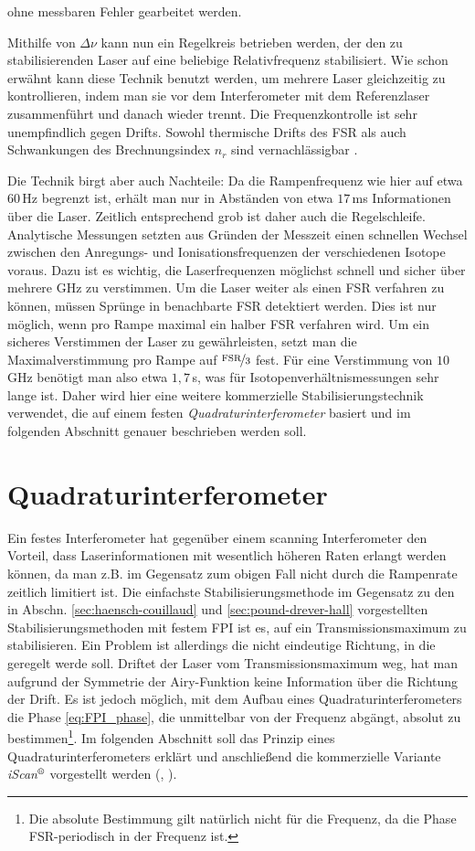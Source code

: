 ohne messbaren Fehler gearbeitet werden.\par
Mithilfe von $\Delta\nu$ kann nun ein Regelkreis betrieben werden, der den zu
stabilisierenden Laser auf eine beliebige Relativfrequenz stabilisiert. Wie
schon erwähnt kann diese Technik benutzt werden, um mehrere Laser
gleichzeitig zu kontrollieren, indem man sie vor dem Interferometer mit dem
Referenzlaser zusammenführt und danach wieder trennt. Die Frequenzkontrolle
ist sehr unempfindlich gegen Drifts. Sowohl thermische Drifts des FSR als auch
Schwankungen des Brechnungsindex $n_r$ sind vernachlässigbar
\cite{kuschnick:2000:diplomarbeit}.\par
Die Technik birgt aber auch Nachteile: Da die Rampenfrequenz wie hier auf etwa
$60\,$Hz begrenzt ist, erhält man nur in Abständen von etwa $17\,$ms
Informationen über die Laser. Zeitlich entsprechend grob ist daher auch die
Regelschleife. Analytische Messungen setzten aus Gründen der Messzeit einen
schnellen Wechsel zwischen den Anregungs- und Ionisationsfrequenzen der verschiedenen
Isotope voraus. Dazu ist es wichtig, die Laserfrequenzen möglichst schnell
und sicher über mehrere GHz zu verstimmen. Um die Laser weiter als einen FSR
verfahren zu können, müssen Sprünge in benachbarte FSR detektiert werden. Dies ist nur möglich, wenn pro Rampe maximal ein halber FSR verfahren wird. Um ein sicheres
Verstimmen der Laser zu gewährleisten, setzt man die Maximalverstimmung pro
Rampe auf $\nicefrac{\text{FSR}}{3}$ fest. Für eine Verstimmung von $10\,$GHz benötigt
man also etwa $1,7\,$s, was für Isotopenverhältnismessungen sehr lange ist.
Daher wird hier eine weitere kommerzielle Stabilisierungstechnik verwendet, die auf einem festen
\textit{Quadraturinterferometer} basiert und im folgenden Abschnitt genauer
beschrieben werden soll.

\section{Quadraturinterferometer}\label{sec:quadraturinterferometer}
Ein festes Interferometer hat gegenüber einem scanning Interferometer den
Vorteil, dass Laserinformationen mit wesentlich höheren Raten erlangt werden
können, da man z.B. im Gegensatz zum obigen Fall nicht durch die Rampenrate
zeitlich limitiert ist. Die einfachste Stabilisierungsmethode im Gegensatz zu
den in Abschn. \ref{sec:haensch-couillaud} und \ref{sec:pound-drever-hall}
vorgestellten Stabilisierungsmethoden mit festem FPI ist es, auf ein Transmissionsmaximum zu
stabilisieren. Ein Problem ist allerdings die nicht eindeutige Richtung, in die
geregelt werde soll. Driftet der Laser vom Transmissionsmaximum weg, hat man
aufgrund der Symmetrie der Airy-Funktion keine Information über die Richtung
der Drift. Es ist jedoch möglich, mit dem Aufbau eines
Quadraturinterferometers die Phase \eqref{eq:FPI_phase}, die unmittelbar von der Frequenz abgängt, absolut zu
bestimmen\footnote{Die absolute Bestimmung gilt natürlich nicht für die
Frequenz, da die Phase FSR-periodisch in der Frequenz ist.}. Im folgenden
Abschnitt soll das Prinzip eines Quadraturinterferometers erklärt und
anschließend die kommerzielle Variante
\textit{iScan$^\text{\textregistered}$} vorgestellt werden
(\cite{kinder:2003:dissertation}, \cite{iscan_hardware_guide}).

